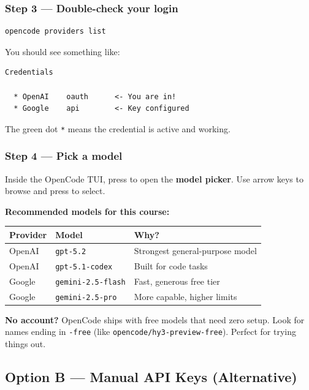 \documentclass[11pt]{article}
\newcommand{\key}[1]{\keystroke{#1}}
\newcommand{\keystroke}[1]{%
  \tikz[baseline=(key.base)]{%
    \node[draw, rounded corners=2pt, inner sep=2pt, fill=gray!10,
          font=\ttfamily\small] (key) {#1};%
  }%
}
\begin{document}
\subsubsection*{Step 3 --- Double-check your login}

\begin{lstlisting}[style=term]
opencode providers list
\end{lstlisting}

You should see something like:

\begin{lstlisting}[style=term]
  Credentials

  * OpenAI    oauth      <- You are in!
  * Google    api        <- Key configured
\end{lstlisting}

The green dot \texttt{*} means the credential is active and working.

\subsubsection*{Step 4 --- Pick a model}

Inside the OpenCode TUI, press \key{Ctrl+O} to open the \textbf{model picker}.  Use arrow keys to browse and press \key{Enter} to select.

\begin{ex-box}
\textbf{Recommended models for this course:}

\medskip
\begin{tabular}{lll}
\toprule
\textbf{Provider} & \textbf{Model} & \textbf{Why?} \\
\midrule
OpenAI & \texttt{gpt-5.2}         & Strongest general-purpose model \\
OpenAI & \texttt{gpt-5.1-codex}   & Built for code tasks \\
Google & \texttt{gemini-2.5-flash} & Fast, generous free tier \\
Google & \texttt{gemini-2.5-pro}   & More capable, higher limits \\
\bottomrule
\end{tabular}

\medskip
\textbf{No account?} OpenCode ships with free models that need zero setup.  Look for names ending in \texttt{-free} (like \texttt{opencode/hy3-preview-free}).  Perfect for trying things out.
\end{ex-box}

\subsection{Option B --- Manual API Keys (Alternative)}
\end{document}
